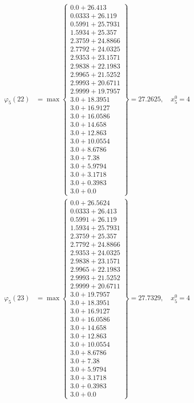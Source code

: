 \documentclass{article}
\begin{document}
\begin{align*}
\varphi_{5}(22) &= \max \left\{ \begin{array}{c}
0.0 + 26.413 \\
 0.0333 + 26.119 \\
 0.5991 + 25.7931 \\
 1.5934 + 25.357 \\
 2.3759 + 24.8866 \\
 2.7792 + 24.0325 \\
 2.9353 + 23.1571 \\
 2.9838 + 22.1983 \\
 2.9965 + 21.5252 \\
 2.9993 + 20.6711 \\
 2.9999 + 19.7957 \\
 3.0 + 18.3951 \\
 3.0 + 16.9127 \\
 3.0 + 16.0586 \\
 3.0 + 14.658 \\
 3.0 + 12.863 \\
 3.0 + 10.0554 \\
 3.0 + 8.6786 \\
 3.0 + 7.38 \\
 3.0 + 5.9794 \\
 3.0 + 3.1718 \\
 3.0 + 0.3983 \\
 3.0 + 0.0
\end{array} \right\}=27.2625, \quad x_{5}^0=4\\
  
\varphi_{5}(23) &= \max \left\{ \begin{array}{c}
0.0 + 26.5624 \\
 0.0333 + 26.413 \\
 0.5991 + 26.119 \\
 1.5934 + 25.7931 \\
 2.3759 + 25.357 \\
 2.7792 + 24.8866 \\
 2.9353 + 24.0325 \\
 2.9838 + 23.1571 \\
 2.9965 + 22.1983 \\
 2.9993 + 21.5252 \\
 2.9999 + 20.6711 \\
 3.0 + 19.7957 \\
 3.0 + 18.3951 \\
 3.0 + 16.9127 \\
 3.0 + 16.0586 \\
 3.0 + 14.658 \\
 3.0 + 12.863 \\
 3.0 + 10.0554 \\
 3.0 + 8.6786 \\
 3.0 + 7.38 \\
 3.0 + 5.9794 \\
 3.0 + 3.1718 \\
 3.0 + 0.3983 \\
 3.0 + 0.0
\end{array} \right\}=27.7329, \quad x_{5}^0=4\\
  

\end{align*}
\end{document}
